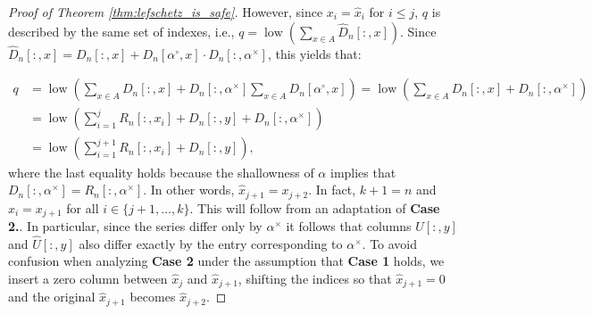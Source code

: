 \documentclass[a4paper,12pt, USenglish,cleveref,autoref,thm-restate]{article}
\newcommand\michal[1]{\textcolor{magenta}{[ML: #1]}}
\DeclareMathOperator{\low}{low}
\newcommand{\mU}{U}
\newcommand{\hmU}{\mU}
\newcommand{\hmUaft}{\hat{\mU}}
\newcommand{\mB}{D}
\newcommand{\hmB}{D}
\newcommand{\hmBaft}{\hat{\mB}}
\newcommand{\hmR}{R}
\newcommand{\cx}{x}
\newcommand{\cy}{y}
\newcommand{\cq}{q}
\newcommand{\bth}[1]{#1^\circ}
\newcommand{\dth}[1]{#1^{\!\times}}
\newcommand{\bds}{\alpha}
\begin{document}
\begin{appendices}
\begin{proof}[Proof of Theorem \ref{thm:lefschetz_is_safe}]
    

    However, since $x_i = \hat{x}_i$ for $i \leq j$, $q$ is described by the same set of indexes, i.e., $q = \low \left(\sum\limits_{\cx  \in A} \hat{\hmB}_n[:,\cx] \right)$.  Since $\hmBaft_n[:,x] = \hmB_n[:,x] + \hmB_n[\bth\bds,x] \cdot \hmB_n[:,\dth\bds]$, this yields that: 
    
    
    \begin{align*} 
    \cq  &= 
    \low \left( \sum\limits_{x \in A}\hmB_n[:,x] + \hmB_n[:,\dth\bds]\sum\limits_{x \in A}\hmB_n[\bth\bds,x] \right)
    = \low \left( \sum\limits_{x \in A}\hmB_n[:,x] + \hmB_n[:,\dth\bds] \right)\\
    &= \low \left(\sum\limits_{i = 1}^{j} \hmR_n[:,\cx_i{}] + \hmB_n[:,\cy] + \hmB_n[:,\dth\bds] \right)\\ 
    &= \low \left(\sum\limits_{i = 1}^{j+1} \hmR_n[:,\cx_i{}] + \hmB_n[:,\cy] \right),
    \end{align*}
    where the last equality holds because the shallowness of $\bds$ implies that $\hmB_n[:,\dth\bds]=\hmR_n[:,\dth\bds]$.
    In other words, $\hat{x}_{j+1} = x_{j+2}$. 
    In fact, $k+1=n$ and $\hat{x}_{i} = x_{j+1}$ for all $i\in\{j+1,\ldots,k\}$.
        This will follow from an adaptation of \textbf{Case 2.}.
        In particular, since the series differ only by $\dth\bds$ it follows that columns $\hmU[:, y]$ and $\hmUaft[:, y]$ 
            also differ exactly by the entry corresponding to $\dth\bds$. To avoid confusion when analyzing \textbf{Case 2} under the assumption that \textbf{Case 1} holds,
we insert a zero column between $\hat{x}_{j}$ and $\hat{x}_{j+1}$,
shifting the indices so that $\hat{x}_{j+1} = 0$ and the original $\hat{x}_{j+1}$ becomes $\hat{x}_{j+2}$.
       
   


\end{proof}
\end{appendices}
\end{document}
